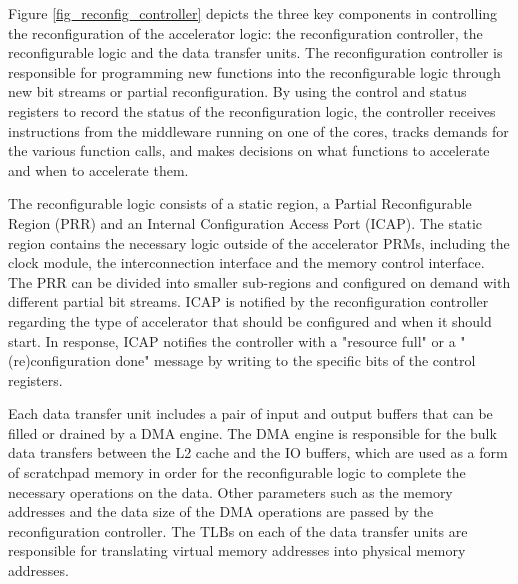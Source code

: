 Figure \ref{fig_reconfig_controller} depicts the three key components
in controlling the reconfiguration of the accelerator logic:
the reconfiguration controller, the reconfigurable logic and the data transfer
units. The reconfiguration controller is responsible for programming
new functions into the reconfigurable logic through new bit streams or
partial reconfiguration. By using the control and status registers to record the
status of the reconfiguration logic, the controller receives
instructions from the middleware running on one of the cores, tracks
demands for the various function calls, and makes decisions on what functions to accelerate and
when to accelerate them.

The reconfigurable logic consists of a static region, a Partial
Reconfigurable Region (PRR) and an Internal Configuration Access Port
(ICAP). The static region contains the necessary logic outside of the
accelerator PRMs, including the clock module, the interconnection interface and the
memory control interface. The PRR can be divided into smaller
sub-regions and configured on demand with different partial bit streams. ICAP is notified by the reconfiguration controller regarding
the type of accelerator 
that should be configured and when it should start. In response, ICAP notifies
the controller with a "resource full" or a "(re)configuration done" message by
writing to the specific bits of the control registers.

Each data transfer unit includes a pair of input and output buffers
that can be filled or drained by a DMA engine. The DMA engine is
responsible for the bulk data transfers between the L2 cache and the
IO buffers, which are used as a form of scratchpad memory in order for the
reconfigurable logic to complete the necessary operations on the data. Other
parameters such as the memory addresses and the data size of the DMA
operations are passed by the reconfiguration controller. The TLBs on each
of the data transfer units are responsible for translating virtual
memory addresses into physical memory addresses.


